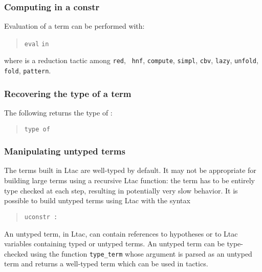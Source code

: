\subsubsection[Computing in a constr]{Computing in a constr
}

Evaluation of a term can be performed with:
\begin{quote}
{\tt eval} {} {\tt in} {\term}
\end{quote}
where  is a reduction tactic among {\tt red}, {\tt
hnf}, {\tt compute}, {\tt simpl}, {\tt cbv}, {\tt lazy}, {\tt unfold},
{\tt fold}, {\tt pattern}.

\subsubsection{Recovering the type of a term}

The following returns the type of {\term}:

\begin{quote}
{\tt type of} {\term}
\end{quote}

\subsubsection[Manipulating untyped terms]{Manipulating untyped terms
}

The terms built in Ltac are well-typed by default. It may not be
appropriate for building large terms using a recursive Ltac function:
the term has to be entirely type checked at each step, resulting in
potentially very slow behavior. It is possible to build untyped terms
using Ltac with the syntax

\begin{quote}
{\tt uconstr :} {\term}
\end{quote}

An untyped term, in Ltac, can contain references to hypotheses or to
Ltac variables containing typed or untyped terms. An untyped term can
be type-checked using the function {\tt type\_term} whose argument is
parsed as an untyped term and returns a well-typed term which can be
used in tactics.

